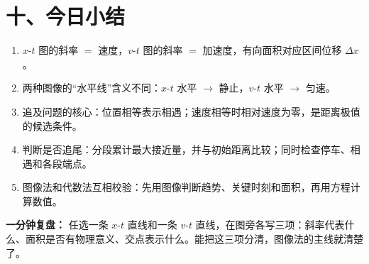 \section*{十、今日小结}

\begin{enumerate}
  \item $x$-$t$ 图的斜率 $=$ 速度，$v$-$t$ 图的斜率 $=$ 加速度，有向面积对应区间位移 $\Delta x$。
  \item 两种图像的“水平线”含义不同：$x$-$t$ 水平 $\to$ 静止，$v$-$t$ 水平 $\to$ 匀速。
  \item 追及问题的核心：位置相等表示相遇；速度相等时相对速度为零，是距离极值的候选条件。
  \item 判断是否追尾：分段累计最大接近量，并与初始距离比较；同时检查停车、相遇和各段端点。
  \item 图像法和代数法互相校验：先用图像判断趋势、关键时刻和面积，再用方程计算数值。
\end{enumerate}

\textbf{一分钟复盘：} 任选一条 $x$-$t$ 直线和一条 $v$-$t$ 直线，在图旁各写三项：斜率代表什么、面积是否有物理意义、交点表示什么。能把这三项分清，图像法的主线就清楚了。
